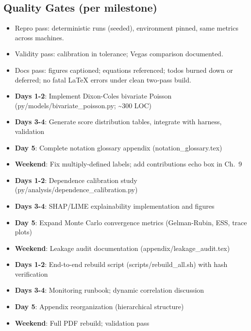 \subsection*{Quality Gates (per milestone)}
\begin{itemize}
  \item Repro pass: deterministic runs (seeded), environment pinned, same metrics across machines.
  \item Validity pass: calibration in tolerance; Vegas comparison documented.
  \item Docs pass: figures captioned; equations referenced; todos burned down or deferred; no fatal LaTeX errors under clean two‑pass build.
\end{itemize}


\begin{itemize}
  \item \textbf{Days 1-2}: Implement Dixon-Coles bivariate Poisson (py/models/bivariate\_poisson.py; \textasciitilde300 LOC)
  \item \textbf{Days 3-4}: Generate score distribution tables, integrate with harness, validation
  \item \textbf{Day 5}: Complete notation glossary appendix (notation\_glossary.tex)
  \item \textbf{Weekend}: Fix multiply-defined labels; add contributions echo box in Ch.~9
\end{itemize}

\begin{itemize}
  \item \textbf{Days 1-2}: Dependence calibration study (py/analysis/dependence\_calibration.py)
  \item \textbf{Days 3-4}: SHAP/LIME explainability implementation and figures
  \item \textbf{Day 5}: Expand Monte Carlo convergence metrics (Gelman-Rubin, ESS, trace plots)
  \item \textbf{Weekend}: Leakage audit documentation (appendix/leakage\_audit.tex)
\end{itemize}

\begin{itemize}
  \item \textbf{Days 1-2}: End-to-end rebuild script (scripts/rebuild\_all.sh) with hash verification
  \item \textbf{Days 3-4}: Monitoring runbook; dynamic correlation discussion
  \item \textbf{Day 5}: Appendix reorganization (hierarchical structure)
  \item \textbf{Weekend}: Full PDF rebuild; validation pass
\end{itemize}


